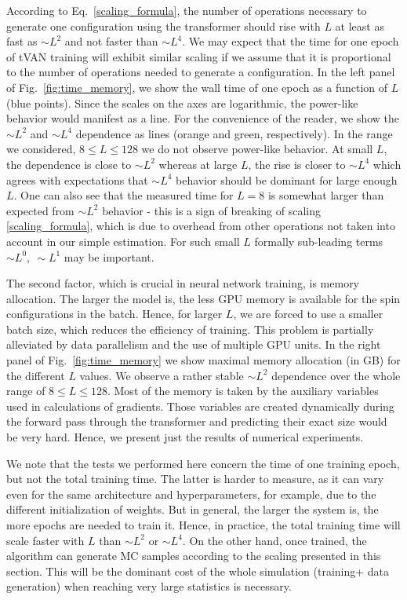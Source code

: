 \documentclass[3p, times,merge]{elsarticle}
\begin{document}
According to Eq.~\ref{scaling_formula}, the number of operations necessary to generate one configuration using the transformer should rise with $L$ at least as fast as $\sim L^2$ and not faster than $\sim L^4$.  We may expect that the time for one epoch of tVAN training will exhibit similar scaling if we assume that it is proportional to the number of operations needed to generate a configuration.
In the left panel of Fig.~\ref{fig:time_memory}, we show the wall time of one epoch as a function of $L$ (blue points). Since the scales on the axes are logarithmic, the power-like behavior would manifest as a line. For the convenience of the reader, we show the $\sim L^2$ and $\sim L^4$ dependence as lines (orange and green, respectively). In the range we considered, $8\le L\le 128$ we do not observe power-like behavior. At small $L$, the dependence is close to $\sim L^2$ whereas at large $L$, the rise is closer to $\sim L^4$ which agrees with expectations that $\sim L^4$ behavior should be dominant for large enough $L$. One can also see that the measured time for $L=8$ is somewhat larger than expected from $\sim L^2$ behavior - this is a sign of breaking of scaling \ref{scaling_formula}, which is due to overhead from other operations not taken into account in our simple estimation. For such small $L$ formally sub-leading terms $\sim L^0, \ \sim L^1$ may be important.

The second factor, which is crucial in neural network training, is memory allocation. The larger the model is, the less GPU memory is available for the spin configurations in the batch. Hence, for larger $L$, we are forced to use a smaller batch size, which reduces the efficiency of training. This problem is partially alleviated by data parallelism and the use of multiple GPU units. In the right panel of Fig.~\ref{fig:time_memory} we show maximal memory allocation (in GB) for the different $L$ values. We observe a rather stable $\sim L^2$ dependence over the whole range of  $8\le L\le 128$. 
Most of the memory is taken by the auxiliary variables used in calculations of gradients.  Those variables are created  dynamically during the forward pass through the transformer and predicting their exact size would be very hard. Hence, we 
present just the results of numerical experiments.


We note that the tests we performed here concern the time of one training epoch, but not the total training time. The latter is harder to measure, as it can vary even for the same architecture and hyperparameters, for example,  due to the different initialization of weights. But in general, the larger the system is, the more epochs are needed to train it. Hence, in practice, the total training time will scale faster with $L$ than $\sim L^2$ or $\sim L^4$. On the other hand, once trained, the algorithm can generate MC samples according to the scaling presented in this section. This will be the dominant cost of the whole simulation (training+ data generation) when reaching very large statistics is necessary.   








\end{document}

